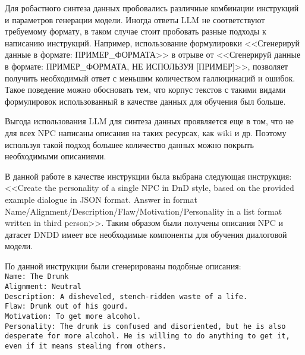 Для робастного синтеза данных пробовались различные комбинации инструкций и параметров генерации модели. Иногда ответы LLM не соответствуют требуемому формату, в таком случае стоит пробовать разные подходы к написанию инструкций. Например, использование формулировки <<Сгенерируй данные в формате: ПРИМЕР\_ФОРМАТА>> в отрыве от <<Сгенерируй данные в формате: ПРИМЕР\_ФОРМАТА, НЕ ИСПОЛЬЗУЯ [ПРИМЕР]>>, позволяет получить необходимый ответ с меньшим количеством галлюцинаций и ошибок. Такое поведение можно обосновать тем, что корпус текстов с такими видами формулировок использованный в качестве данных для обучения был больше.

Выгода использования LLM для синтеза данных проявляется еще в том, что не для всех NPC написаны описания на таких ресурсах, как wiki и др. Поэтому используя такой подход большее количество данных можно покрыть необходимыми описаниями.

В данной работе в качестве инструкции была выбрана следующая инструкция: <<Create the personality of a single NPC in DnD style, based on the provided example dialogue in JSON format. Answer in format Name/Alignment/Description/Flaw/Motivation/Personality in a list format written in third person>>. Таким образом были получены описания NPC и датасет DNDD имеет все необходимые компоненты для обучения диалоговой модели.

По данной инструкции были сгенерированы подобные описания: \texttt{\\Name: The Drunk\\
  Alignment: Neutral\\
  Description: A disheveled, stench-ridden waste of a life.\\
  Flaw: Drunk out of his gourd.\\
  Motivation: To get more alcohol.\\
  Personality: The drunk is confused and disoriented, but he is also desperate for more alcohol. He is willing to do anything to get it, even if it means stealing from others.}


